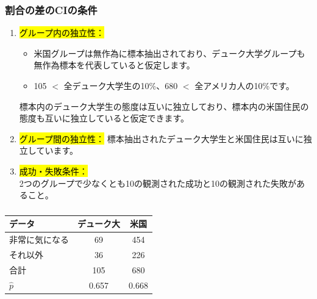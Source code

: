 \begin{frame}
\frametitle{割合の差のCIの条件}

\begin{enumerate}

\item \hl{グループ内の独立性：}
\begin{itemize}
\item 米国グループは無作為に標本抽出されており、デューク大学グループも無作為標本を代表していると仮定します。
\item 105 $<$ 全デューク大学生の10\%、680 $<$ 全アメリカ人の10\%です。
\end{itemize}
標本内のデューク大学生の態度は互いに独立しており、標本内の米国住民の態度も互いに独立していると仮定できます。

\item \hl{グループ間の独立性：}
標本抽出されたデューク大学生と米国住民は互いに独立しています。

\item \hl{成功・失敗条件：}\\
2つのグループで少なくとも10の観測された成功と10の観測された失敗があること。

\end{enumerate}

\end{frame}


\begin{frame}
\frametitle{}


{\footnotesize
\begin{center}
\begin{tabular}{l | c c}
データ			& デューク大	& 米国 \\
\hline
非常に気になる	& 69			& 454 \\
それ以外		& 36			& 226 \\
\hline
合計			& 105		& 680 \\
\hline
$\hat{p}$		& 0.657		& 0.668
\end{tabular}
\end{center}
}



\end{frame}

